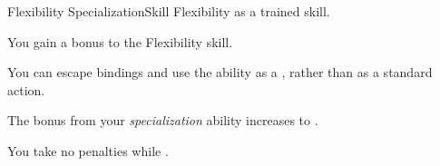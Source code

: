 
  \begin{feat}{Flexibility Specialization}{Skill}
    \featpre Flexibility as a trained skill.

     You gain a  bonus to the Flexibility skill.

     You can escape bindings and use the  ability as a , rather than as a standard action.

     The bonus from your \textit{specialization} ability increases to .

     You take no penalties while \squeezing.
  \end{feat}


